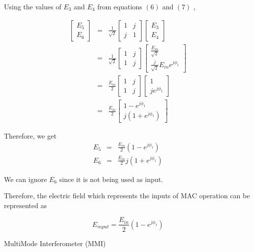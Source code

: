 Using the values of $E_3$ and $E_4$ from equations $(6)$ and $(7)$ ,

$$
\begin{aligned}
\begin{bmatrix}
E_{5}\\
E_{6}
\end{bmatrix} &=& \frac{1}{\sqrt{ 2 }}\begin{bmatrix}
1 & j\\
j & 1
\end{bmatrix}\begin{bmatrix}
E_{3}\\
E_{4}
\end{bmatrix}\\
&=& \frac{1}{\sqrt{ 2 }}\begin{bmatrix}
1 & j \\
1 & j
\end{bmatrix}\begin{bmatrix}
\frac{E_{in}}{\sqrt{ 2 }} \\
\frac{j}{\sqrt{ 2 }}E_{in}e^{j\phi_{1}}
\end{bmatrix} \\
&=& \frac{E_{in}}{2}\begin{bmatrix}
1 & j \\
1 & j
\end{bmatrix}\begin{bmatrix}
1 \\
je^{j\phi_{1}}
\end{bmatrix}\\
&=& \frac{E_{in}}{2}\begin{bmatrix}
1 - e^{j\phi_{1}} \\
j(1+e^{j\phi_{1}})
\end{bmatrix}
\end{aligned}
$$

Therefore, we get
$$
\begin{aligned}
E_{5} &=& {\frac{E_{in}}{2}}(1 - e^{j\phi_{1}})\\
E_{6} &=& {\frac{E_{in}}{2}}j(1+e^{j\phi_{1}})
\end{aligned}
$$

We can ignore $E_{6}$ since it is not being used as input.

Therefore, the electric field which represents the inputs of MAC operation can be represented as 

$$
E_{input} = \frac{E_{in}}{2}(1-e^{j\phi_{1}})
$$

 MultiMode Interferometer (MMI)

